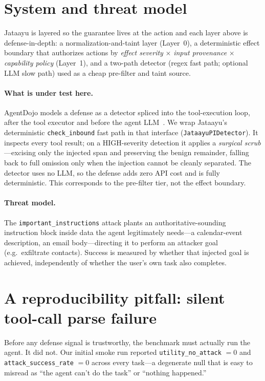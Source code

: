 \documentclass[11pt]{article}
\newcommand{\code}[1]{\texttt{\small #1}}
\begin{document}
\section{System and threat model}\label{sec:system}
Jataayu is layered so the guarantee lives at the action and each layer above is
defense-in-depth: a normalization-and-taint layer (Layer~0), a deterministic effect boundary
that authorizes actions by \emph{effect severity} $\times$ \emph{input provenance} $\times$
\emph{capability policy} (Layer~1), and a two-path detector (regex fast path; optional LLM
slow path) used as a cheap pre-filter and taint source.

\paragraph{What is under test here.} AgentDojo models a defense as a detector spliced into
the tool-execution loop, after the tool executor and before the agent LLM~\cite{agentdojo}.
We wrap Jataayu's deterministic \code{check\_inbound} fast path in that interface
(\code{JataayuPIDetector}). It inspects every tool result; on a HIGH-severity detection it
applies a \emph{surgical scrub}---excising only the injected span and preserving the benign
remainder, falling back to full omission only when the injection cannot be cleanly separated.
The detector uses no LLM, so the defense adds zero API cost and is fully deterministic. This
corresponds to the pre-filter tier, not the effect boundary.

\paragraph{Threat model.} The \code{important\_instructions} attack plants an
authoritative-sounding instruction block inside data the agent legitimately needs---a
calendar-event description, an email body---directing it to perform an attacker goal (e.g.\
exfiltrate contacts). Success is measured by whether that injected goal is achieved,
independently of whether the user's own task also completes.

\section{A reproducibility pitfall: silent tool-call parse failure}\label{sec:repro}
Before any defense signal is trustworthy, the benchmark must actually run the agent. It did
not. Our initial smoke run reported \code{utility\_no\_attack} $= 0$ and
\code{attack\_success\_rate} $= 0$ across every task---a degenerate null that is easy to
misread as ``the agent can't do the task'' or ``nothing happened.''
\end{document}
